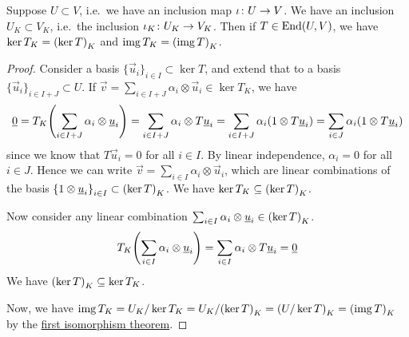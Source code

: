 \begin{proposition}
    Suppose \(U \subset V\), i.e.\ we have an inclusion map \(\iota\colon U\to V\).
    We have an inclusion \(U_K \subset V_K\), i.e.\ the inclusion \(\iota_K\colon U_K\to V_K\).
    Then if \(T \in \operatorname{End}(U,V)\),
    we have \(\ker T_K = \pqty{\ker T}_K\) and \(\img T_K = \pqty{\img T}_K\).
\end{proposition}
\begin{proof}
    Consider a basis \({\{\vec{u}_i\}}_{i \in I} \subset \ker T\),
    and extend that to a basis \({\{\vec{u}_i\}}_{i \in I+J} \subset U\).
    If \(\vec{v} = \sum_{i \in I+J} \alpha_i\otimes\vec{u}_i \in \ker T_K\),
    we have
    \begin{equation*}
        \vec{0} = T_K\pqty{\sum_{i \in I+J} \alpha_i\otimes\vec{u}_i}
        = \sum_{i \in I+J} \alpha_i \otimes T\vec{u}_i
        = \sum_{i \in I+J} \alpha_i (1 \otimes T\vec{u}_i)
        = \sum_{i \in J} \alpha_i (1 \otimes T\vec{u}_i)
    \end{equation*}
    since we know that \(T\vec{u}_i = 0\) for all \(i \in I\).
    By linear independence, \(\alpha_i = 0\) for all \(i \in J\).
    Hence we can write \(\vec{v} = \sum_{i \in I} \alpha_i\otimes\vec{u}_i\),
    which are linear combinations of
    the basis \({\{1\otimes\vec{u}_i\}}_{i \in I} \subset \pqty{\ker T}_K\).
    We have \(\ker T_K \subseteq \pqty{\ker T}_K\).

    Now consider any linear combination \(\sum_{i \in I} \alpha_i\otimes\vec{u}_i \in \pqty{\ker T}_K\).
    \begin{equation*}
        T_K\pqty{\sum_{i \in I} \alpha_i\otimes\vec{u}_i}
        = \sum_{i \in I} \alpha_i \otimes T\vec{u}_i = \vec{0}
    \end{equation*}
    We have \(\pqty{\ker T}_K \subseteq \ker T_K\).

    Now, we have \(\img T_K = U_K/\ker T_K = U_K/\pqty{\ker T}_K = \pqty{U/\ker T}_K = \pqty{\img T}_K\)
    by the \hyperref[thm:iso-1-vsp]{first isomorphism theorem}.
\end{proof}


